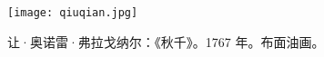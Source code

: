 \clearpage
\begin{figure}[ht]
  \centering
  \texttt{[image: qiuqian.jpg]}
  \caption[让·奥诺雷·弗拉戈纳尔：《秋千》]{让·奥诺雷·弗拉戈纳尔：《秋千》。1767 年。布面油画。}\label{fig-qiuqian}

\end{figure}

